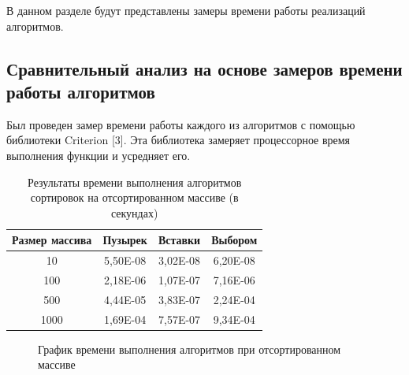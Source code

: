 \documentclass[14pt,russian]{scrartcl}
\begin{document}
В данном разделе будут представлены замеры времени работы реализаций алгоритмов.

\subsection{Сравнительный анализ на основе замеров времени работы алгоритмов}
	
	Был проведен замер времени работы каждого из алгоритмов с помощью библиотеки Criterion [3]. Эта библиотека замеряет процессорное время выполнения функции и усредняет его. \\

    \begin{table}[htb]
        \caption{\centering Результаты времени выполнения алгоритмов сортировок на отсортированном массиве (в секундах)}
        \centering
        \begin{tabular}{|c|c|c|c|}
        \hline
        Размер массива & Пузырек  & Вставки  & Выбором  \\ \hline
        10             & 5,50E-08 & 3,02E-08 & 6,20E-08 \\ \hline
        100            & 2,18E-06 & 1,07E-07 & 7,16E-06 \\ \hline
        500            & 4,44E-05 & 3,83E-07 & 2,24E-04 \\ \hline
        1000           & 1,69E-04 & 7,57E-07 & 9,34E-04 \\ \hline
        \end{tabular}
        \label{tab:sorted_bench}
    \end{table}

    \begin{figure}[ht]
        \centering
    \caption{График времени выполнения алгоритмов при отсортированном массиве}
    \end{figure}
\end{document}
